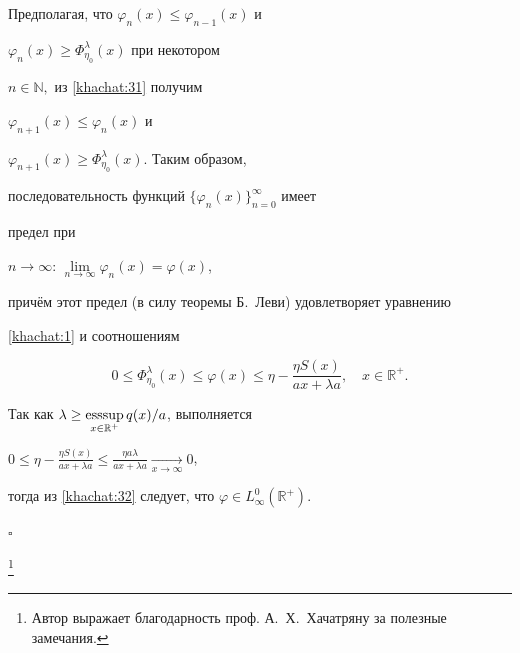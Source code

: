 Предполагая, что $\varphi_n(x)\leq\varphi_{n-1}(x)$ и

$\varphi_n(x)\geq\Phi_{\eta_0}^{\lambda}(x)$ при некотором

$n\in\mathbb{N},$ из \eqref{khachat:31} получим

$\varphi_{n+1}(x)\leq\varphi_n(x)$ и

$\varphi_{n+1}(x)\geq\Phi_{\eta_0}^{\lambda}(x).$ Таким образом,

последовательность функций $\{\varphi_n(x)\}_{n=0}^{\infty}$ имеет

предел при

$n\rightarrow\infty$: $\lim\limits_{n\rightarrow\infty}\varphi_n(x)=\varphi(x)$,

причём  этот предел (в силу теоремы Б.~Леви) удовлетворяет уравнению

\eqref{khachat:1} и соотношениям

\begin{equation}

0\leq\Phi_{\eta_0}^{\lambda}(x)\leq\varphi(x)\leq\eta-\frac{\eta

S(x)}{ax+\lambda a},\quad x\in\mathbb{R}^+.\label{khachat:32}

\end{equation}

Так как $\lambda\geq{\mathop{\rm esssup}\limits_{x\in\mathbb{R}^+} q(x)}/{a}$, выполняется

$0\leq\eta-\frac{\eta S(x)}{ax+\lambda a}\leq\frac{\eta a\lambda}{ax+\lambda a}\underset{x\rightarrow\infty} \rightarrow 0$,

тогда из \eqref{khachat:32} следует, что $\varphi\in L_{\infty}^0(\mathbb{R}^+).$

$\square$



\thanks{Автор выражает благодарность проф. А.~Х.~Хачатряну за полезные замечания.}



